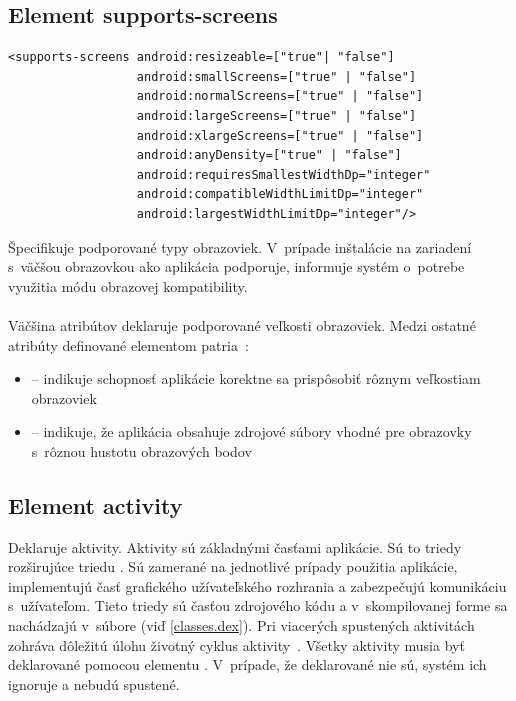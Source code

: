 \subsection{Element supports-screens}
\lstset{language=XML}
\begin{lstlisting}
<supports-screens android:resizeable=["true"| "false"]
                  android:smallScreens=["true" | "false"]
                  android:normalScreens=["true" | "false"]
                  android:largeScreens=["true" | "false"]
                  android:xlargeScreens=["true" | "false"]
                  android:anyDensity=["true" | "false"]
                  android:requiresSmallestWidthDp="integer"
                  android:compatibleWidthLimitDp="integer"
                  android:largestWidthLimitDp="integer"/>
\end{lstlisting}
Špecifikuje podporované typy obrazoviek. V~prípade inštalácie na zariadení s~väčšou obrazovkou ako aplikácia podporuje, informuje systém o~potrebe využitia módu obrazovej kompatibility.\\\\ Väčšina atribútov deklaruje podporované veľkosti obrazoviek. Medzi ostatné atribúty definované elementom  patria~\cite{elScreen}:\\
\begin{itemize}
\item {} -- indikuje schopnosť aplikácie korektne sa prispôsobiť rôznym veľkostiam obrazoviek
\item {} -- indikuje, že aplikácia obsahuje zdrojové súbory vhodné pre obrazovky s~rôznou hustotu obrazových bodov
\end{itemize}

\subsection{Element activity}
\label{el_activity}
Deklaruje aktivity. Aktivity sú základnými časťami aplikácie. Sú to triedy rozširujúce triedu . Sú zamerané na jednotlivé prípady použitia aplikácie, implementujú časť grafického užívateľského rozhrania a zabezpečujú komunikáciu s~užívateľom. Tieto triedy sú časťou zdrojového kódu a v~skompilovanej forme sa nachádzajú v~súbore  (viď \ref{classes.dex}). Pri viacerých spustených aktivitách zohráva dôležitú úlohu životný cyklus aktivity~\cite{elActivity}. Všetky aktivity musia byť deklarované pomocou elementu . V~prípade, že deklarované nie sú, systém ich ignoruje a nebudú spustené.


